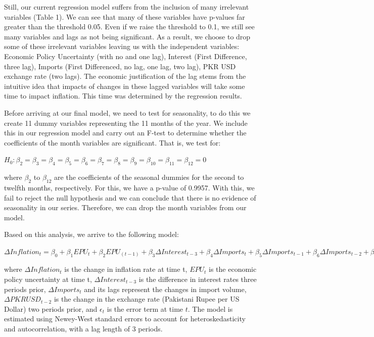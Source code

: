\documentclass[11pt]{article}
\begin{document}
Still, our current regression model suffers from the inclusion of many irrelevant variables (Table 1). We can see that many of these variables have p-values far greater than the threshold 0.05. Even if we raise the threshold to 0.1, we still see many variables and lags as not being significant. As a result, we choose to drop some of these irrelevant variables leaving us with the independent variables: Economic Policy Uncertainty (with no and one lag), Interest (First Difference, three lag), Imports (First Differenced, no lag, one lag, two lag), PKR USD exchange rate (two lags). The economic justification of the lag stems from the intuitive idea that impacts of changes in these lagged variables will take some time to impact inflation. This time was determined by the regression results.\newline

Before arriving at our final model, we need to test for seasonality, to do this we create 11 dummy variables representing the 11 months of the year. We include this in our regression model and carry out an F-test to determine whether the coefficients of the month variables are significant. That is, we test for:
\begin{center}
    $H_0: \beta_2 = \beta_3 = \beta_4 = \beta_5 = \beta_6 = \beta_7 = \beta_8 = \beta_9 = \beta_{10} = \beta_{11} = \beta_{12} = 0$    
\end{center}
where $\beta_2$ to $\beta_{12}$ are the coefficients of the seasonal dummies for the second to twelfth months, respectively. For this, we have a p-value of 0.9957. With this, we fail to reject the null hypothesis and we can conclude that there is no evidence of seasonality in our series. Therefore, we can drop the month variables from our model. \newline

Based on this analysis, we arrive to the following model:
\begin{center}
    $\Delta Inflation_t = \beta_0 + \beta_1EPU_t + \beta_2EPU_(t-1) + \beta_3 \Delta  Interest_{t-3} + \beta_4 \Delta  Imports_t + \beta_5 \Delta Imports_{t-1} + \beta_6 \Delta  Imports_{t-2} + \beta_7 \Delta  PKRUSD_{t-2} + \epsilon_t$  
\end{center}

where $\Delta Inflation_t$ is the change in inflation rate at time t, $EPU_t$ is the economic policy uncertainty at time t, $\Delta Interest_{t-3}$ is the difference in interest rates three periods prior, $\Delta Imports_t$ and its lags represent the changes in import volume, $\Delta PKRUSD_{t-2}$ is the change in the exchange rate (Pakistani Rupee per US Dollar) two periods prior, and $\epsilon_t$ is the error term at time $t$. The model is estimated using Newey-West standard errors to account for heteroskedasticity and autocorrelation, with a lag length of 3 periods. \newline
\end{document}
